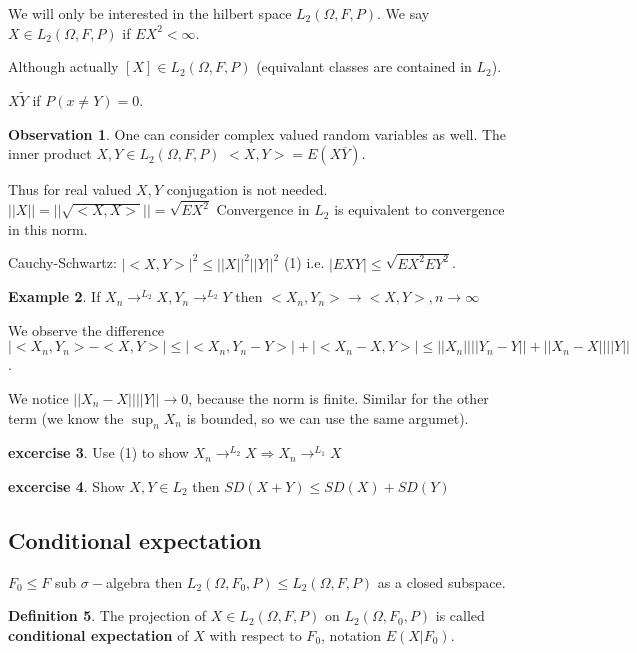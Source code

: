 \documentclass[12pt,a4paper]{amsart}
\theoremstyle{definition} %
\newtheorem{defn}{Definition}[section]
\newtheorem{example}[defn]{Example}
\newtheorem{excercise}[defn]{excercise}
\newtheorem{observation}[defn]{Observation}
\theoremstyle{plain} %
\begin{document}
We will only be interested in the hilbert space $L_2(\Omega, F, P)$. We say $X \in L_2(\Omega, F, P)$ if $EX^2 < \infty$.

Although actually $[X] \in L_2(\Omega, F, P)$ (equivalant classes are contained in $L_2$). 

$X \tilde Y$ if $P(x \neq Y) = 0$.

\begin{observation}
One can consider complex valued random variables as well. The inner product $X, Y \in L_2(\Omega, F, P)$
$<X,Y> = E(X \overline{Y})$.
\end{observation}

Thus for real valued $X,Y$ conjugation is not needed. 
$||  X || = ||\sqrt{<X,X>}|| = \sqrt{EX^2}$
Convergence in $L_2$ is equivalent to convergence in this norm.

Cauchy-Schwartz:
$|<X,Y>|^2 \leq ||X||^2 ||Y||^2$ (1)
i.e.
$|EXY| \leq \sqrt{EX^2 EY^2}$.

\begin{example}
If $X_n \rightarrow^{L_2} X, Y_n \rightarrow^{L_2} Y$ then
$<X_n, Y_n> \rightarrow <X,Y>, n\rightarrow \infty$
\end{example}
\proof
We observe the difference $|<X_n, Y_n> - <X,Y>| \leq |<X_n, Y_n - Y>| + |<X_n - X, Y>| \leq ||X_n|| ||Y_n - Y|| + ||X_n - X|| ||Y||$. 

We notice $||X_n - X||||Y||\rightarrow 0$, because the norm is finite. Similar for the other term (we know the $\sup_n X_n$ is bounded, so we can use the same argumet). 
\endproof


\begin{excercise}
Use 
(1) to show $X_n \rightarrow^{L_2} X \Rightarrow X_n \rightarrow^{L_1} X$
\end{excercise}


\begin{excercise}
Show $X, Y \in L_2$ then
$SD(X + Y) \leq SD(X) + SD(Y)$
\end{excercise}

\subsection{Conditional expectation}

$F_0 \leq F$ sub $\sigma-$algebra then
$L_2(\Omega, F_0, P) \leq L_2(\Omega, F, P)$ as a closed subspace.


\begin{defn}
The projection of $X \in L_2(\Omega, F, P)$ on  $L_2(\Omega, F_0, P)$ is called {\bf conditional expectation} of $X$ with respect to $F_0$, notation $E(X | F_0)$.
\end{defn}
\end{document}
